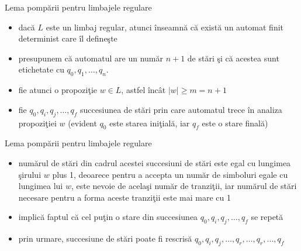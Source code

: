 \documentclass[pdf]{beamer}
\begin{document}
\begin{frame}{Lema pompării pentru limbajele regulare}
\begin{itemize}
\item
dacă $ L $ este un limbaj regular, atunci înseamnă că există un automat finit determinist care îl defineşte
\item
presupunem că automatul are un număr $ n + 1 $ de stări şi că acestea sunt etichetate cu $ q_0, q_1, \dots, q_n $. 
\item
fie atunci o propoziţie $ w \in L $, astfel încât $ |w| \geq m = n +1 $ 
\item
fie $ q_0, q_i, q_j, \dots, q_f $ succesiunea de stări prin care automatul trece în analiza propoziţiei $ w $ (evident $ q_0 $ este starea iniţială, iar $ q_f $ este o stare finală)
\end{itemize}
\end{frame}



\begin{frame}{Lema pompării pentru limbajele regulare}
\begin{itemize}
\item
numărul de stări din cadrul acestei succesiuni de stări este egal cu lungimea şirului $ w $ plus 1, deoarece pentru a accepta un număr de simboluri egale cu lungimea lui $ w $, este nevoie de acelaşi număr de tranziţii, iar numărul de stări necesare pentru a forma aceste tranziţii este mai mare cu 1
\item
implică faptul că cel puţin o stare din succesiunea $ q_0, q_i, q_j, \dots, q_f $ se repetă
\item
prin urmare, succesiune de stări poate fi rescrisă $ q_0, q_i, q_j, \dots, q_r, \dots, q_r, \dots, q_f $
\end{itemize}
\end{frame}
\end{document}
